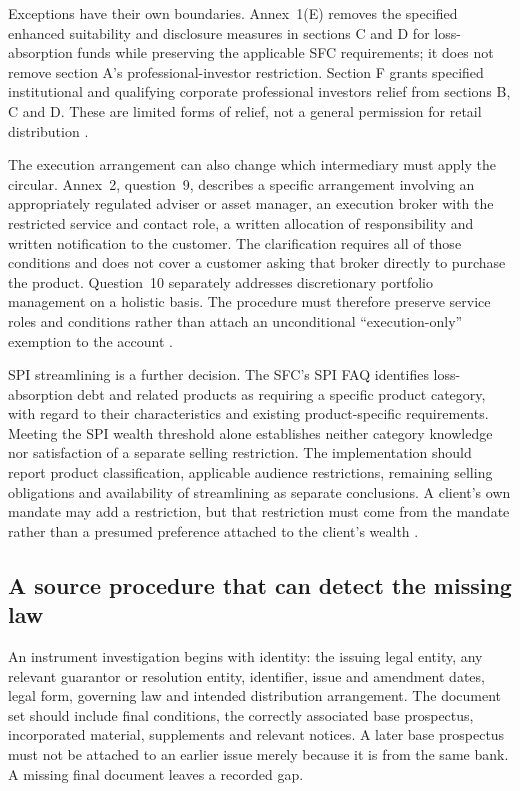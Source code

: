 Exceptions have their own boundaries. Annex~1(E) removes the specified enhanced
suitability and disclosure measures in sections C and D for loss-absorption
funds while preserving the applicable SFC requirements; it does not remove
section A's professional-investor restriction. Section F grants specified
institutional and qualifying corporate professional investors relief from
sections B, C and D. These are limited forms of relief, not a general
permission for retail distribution
\citep[sections~E--F]{hkmalacannex2022}.

The execution arrangement can also change which intermediary must apply the
circular. Annex~2, question~9, describes a specific arrangement involving an
appropriately regulated adviser or asset manager, an execution broker with
the restricted service and contact role, a written allocation of responsibility
and written notification to the customer. The clarification requires all of
those conditions and does not cover a customer asking that broker directly to
purchase the product. Question~10 separately addresses discretionary portfolio
management on a holistic basis. The procedure must therefore preserve service
roles and conditions rather than attach an unconditional ``execution-only''
exemption to the account \citep[questions~9--10]{hkmalacfaq2022}.

SPI streamlining is a further decision. The SFC's SPI FAQ identifies
loss-absorption debt and related products as requiring a specific product
category, with regard to their characteristics and existing product-specific
requirements. Meeting the SPI wealth threshold alone establishes neither
category knowledge nor satisfaction of a separate selling restriction.
The implementation should report product classification, applicable audience
restrictions, remaining selling obligations and availability of streamlining
as separate conclusions. A client's own mandate may add a restriction, but
that restriction must come from the mandate rather than a presumed preference
attached to the client's wealth
\citep[questions~3--4]{sfcspiprospectusfaq}.

\subsection{A source procedure that can detect the missing law}

An instrument investigation begins with identity: the issuing legal entity,
any relevant guarantor or resolution entity, identifier, issue and amendment
dates, legal form, governing law and intended distribution arrangement. The
document set should include final conditions, the correctly associated base
prospectus, incorporated material, supplements and relevant notices. A later
base prospectus must not be attached to an earlier issue merely because it is
from the same bank. A missing final document leaves a recorded gap.

